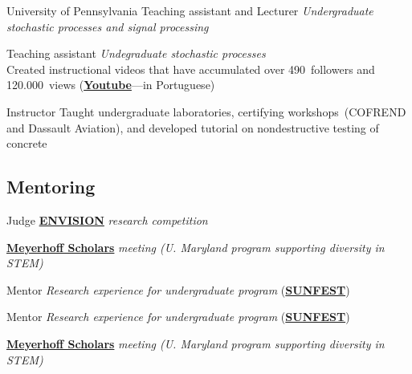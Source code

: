 \documentclass{cvlfoc}
\begin{document}
\begin{entrydate}
		{University of Pennsylvania}
		{Teaching assistant and Lecturer}
		{\emph{Undergraduate stochastic processes and signal processing}}

		{Teaching assistant}
		{\emph{Undegraduate stochastic processes}\\
		Created instructional videos that have accumulated over 490~followers and\\ 120.000~views
		(\href{https://www.youtube.com/@videos-aleatorios}{\textbf{Youtube}}---in Portuguese)}

		{Instructor}
		{Taught undergraduate laboratories, certifying workshops~(COFREND and Dassault Aviation), and developed tutorial on nondestructive testing of concrete}
\end{entrydate}


\subsection*{Mentoring}

\begin{entrydate}
		{Judge}
		{\href{http://envisionrc.com/}{\textbf{ENVISION}} \emph{research competition}}

		{}
		{\href{https://meyerhoff.umbc.edu/}{\textbf{Meyerhoff Scholars}} \emph{meeting
		(U. Maryland program supporting diversity in STEM)}}

		{Mentor}
		{\emph{Research experience for undergraduate program} (\href{https://sunfest.seas.upenn.edu}{\textbf{SUNFEST}})}

		{Mentor}
		{\emph{Research experience for undergraduate program} (\href{https://sunfest.seas.upenn.edu}{\textbf{SUNFEST}})}

		{}
		{\href{https://meyerhoff.umbc.edu/}{\textbf{Meyerhoff Scholars}} \emph{meeting
		(U. Maryland program supporting diversity in STEM)}}
\end{entrydate}





\end{document}
